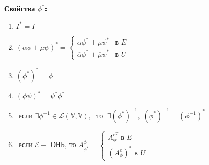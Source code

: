 \begin{shex}
    \textbf{Свойства $\phi^*$:}
    \begin{enumerate}
        \item $ I^* = I$
        \item $(\alpha \phi + \mu \psi)^* = 
        \begin{cases}
            \alpha \phi^* + \mu \psi^* & \text{в } E \\
            \overline{\alpha} \phi^* + \overline{\mu} \psi^* & \text{в } U
        \end{cases}$
        \item $ (\phi^*)^* = \phi$
        \item $ (\phi \psi)^* = \psi^* \phi^*$
        \item $\text{ если } \exists \phi^{-1} \in \mathcal{L}(\mathbb{V}, \mathbb{V}), \; \text{ то } \; \exists (\phi^*)^{-1}, \; (\phi^*)^{-1} = (\phi^{-1})^*$
        \item $ \text{ если } \mathcal{E} - \text{ ОНБ, то } A^{\phi}_{\phi^*} = 
        \begin{cases}
            A^{e^T}_{\phi} \text{ в } E \\
            (A^{e}_{\phi})^* \text{ в } U
        \end{cases}$
    \end{enumerate}
\end{shex}

